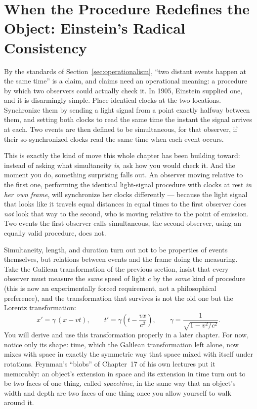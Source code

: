 \documentclass[12pt]{book}
\begin{document}
\section[When the Procedure Redefines the Object]{When the Procedure Redefines the Object: Einstein's Radical Consistency}
\label{sec:einstein}

By the standards of Section~\ref{sec:operationalism}, ``two distant events happen at the same time'' is a claim, and claims need an operational meaning: a procedure by which two observers could actually check it. In 1905, Einstein supplied one, and it is disarmingly simple. Place identical clocks at the two locations. Synchronize them by sending a light signal from a point exactly halfway between them, and setting both clocks to read the same time the instant the signal arrives at each. Two events are then defined to be simultaneous, for that observer, if their so-synchronized clocks read the same time when each event occurs.

This is exactly the kind of move this whole chapter has been building toward: instead of asking what simultaneity \emph{is}, ask how you would check it. And the moment you do, something surprising falls out. An observer moving relative to the first one, performing the identical light-signal procedure with clocks at rest \emph{in her own frame}, will synchronize her clocks differently --- because the light signal that looks like it travels equal distances in equal times to the first observer does \emph{not} look that way to the second, who is moving relative to the point of emission. Two events the first observer calls simultaneous, the second observer, using an equally valid procedure, does not.

Simultaneity, length, and duration turn out not to be properties of events themselves, but relations between events and the frame doing the measuring. Take the Galilean transformation of the previous section, insist that every observer must measure the \emph{same} speed of light $c$ by the \emph{same} kind of procedure (this is now an experimentally forced requirement, not a philosophical preference), and the transformation that survives is not the old one but the Lorentz transformation:
\[
  x' = \gamma\,(x - vt), \qquad t' = \gamma\left(t - \frac{vx}{c^2}\right), \qquad \gamma = \frac{1}{\sqrt{1 - v^2/c^2}}.
\]
You will derive and use this transformation properly in a later chapter. For now, notice only its shape: time, which the Galilean transformation left alone, now mixes with space in exactly the symmetric way that space mixed with itself under rotations. Feynman's ``blobs'' of Chapter~17 of his own lectures put it memorably: an object's extension in space and its extension in time turn out to be two faces of one thing, called \emph{spacetime}, in the same way that an object's width and depth are two faces of one thing once you allow yourself to walk around it.
\end{document}
